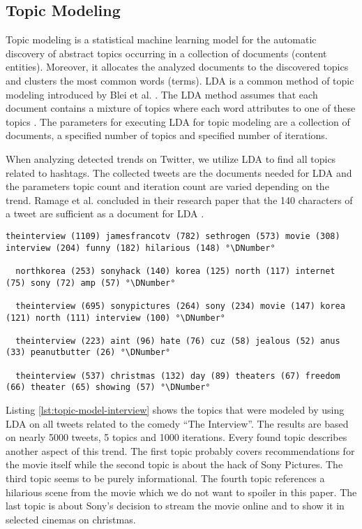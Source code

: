\subsection{Topic Modeling}
\label{subsec:topic-modelling}
Topic modeling is a statistical machine learning model for the automatic discovery of abstract topics occurring in a collection of documents (content entities). Moreover, it allocates the analyzed documents to the discovered topics and clusters the most common words (terms). LDA is a common method of topic modeling introduced by Blei et al. \cite{Blei03lda}. The LDA method assumes that each document contains a mixture of topics where each word attributes to one of these topics \cite{Blei03lda}. The parameters for executing LDA for topic modeling are a collection of documents, a specified number of topics and specified number of iterations.

When analyzing detected trends on Twitter, we utilize LDA to find all topics related to hashtags. The collected tweets are the documents needed for LDA and the parameters topic count and iteration count are varied depending on the trend. Ramage et al. concluded in their research paper that the 140 characters of a tweet are sufficient as a document for LDA \cite{ramage2010lda}.

\begin{lstlisting}[caption={[Topic Model for the Sony Hack Concerning the Movie \enquote{The Interview}] Topic Model for the Sony Hack Concerning the Movie \enquote{The Interview}}, label={lst:topic-model-interview}, float=h]
  theinterview (1109) jamesfrancotv (782) sethrogen (573) movie (308) interview (204) funny (182) hilarious (148) °\DNumber°

  northkorea (253) sonyhack (140) korea (125) north (117) internet (75) sony (72) amp (57) °\DNumber°

  theinterview (695) sonypictures (264) sony (234) movie (147) korea (121) north (111) interview (100) °\DNumber°

  theinterview (223) aint (96) hate (76) cuz (58) jealous (52) anus (33) peanutbutter (26) °\DNumber°

  theinterview (537) christmas (132) day (89) theaters (67) freedom (66) theater (65) showing (57) °\DNumber°
\end{lstlisting}

Listing \ref{lst:topic-model-interview} shows the topics that were modeled by using LDA on all tweets related to the comedy \enquote{The Interview}. The results are based on nearly 5000 tweets, 5 topics and 1000 iterations. Every found topic describes another aspect of this trend. The first topic probably covers recommendations for the movie itself while the second topic is about the hack of Sony Pictures. The third topic seems to be purely informational. The fourth topic references a hilarious scene from the movie which we do not want to spoiler in this paper. The last topic is about Sony's decision to stream the movie online and to show it in selected cinemas on christmas.

